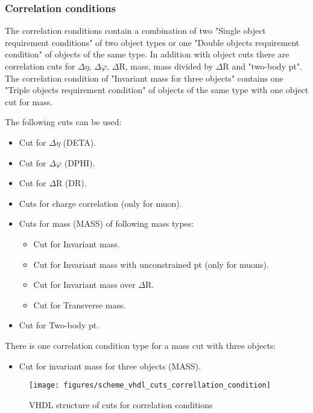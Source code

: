 \clearpage

\subsubsection{Correlation conditions}
\label{sec:gtl:correlation_conditions}

The correlation conditions contain a combination of two "Single object requirement conditions" of two object types or one "Double objects requirement condition" of objects of the same type. In addition with object cuts there are correlation cuts for $\Delta\eta$, $\Delta\varphi$, $\Delta$R, mass, mass divided by $\Delta$R and "two-body pt".\\
The correlation condition of "Invariant mass for three objects" contains one "Triple objects requirement condition" of objects of the same type with one object cut for mass.

The following cuts can be used:
\begin{itemize}
\item Cut for $\Delta\eta$ (DETA).
\item Cut for $\Delta\varphi$ (DPHI).
\item Cut for $\Delta$R (DR).
\item Cuts for charge correlation (only for muon).
\item Cuts for mass (MASS) of following mass types:
  \begin{itemize}
  \item Cut for Invariant mass.
  \item Cut for Invariant mass with unconstrained pt (only for muons).
  \item Cut for Invariant mass over $\Delta$R.
  \item Cut for Transverse mass.
  \end{itemize}
\item Cut for Two-body pt.
\end{itemize}

There is one correlation condition type for a mass cut with three objects:
\begin{itemize}
\item Cut for invariant mass for three objects (MASS).
\end{itemize}

\begin{figure}[htb]
\centering
\texttt{[image: figures/scheme\_vhdl\_cuts\_correllation\_condition]}
\caption{VHDL structure of cuts for correlation conditions}
\label{fig:gtl:scheme_vhdl_cuts_correllation_condition}
\end{figure}

